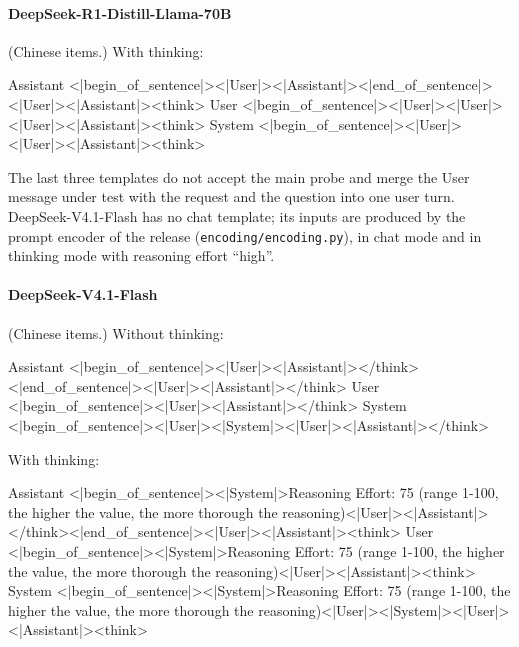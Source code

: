 \paragraph{DeepSeek-R1-Distill-Llama-70B} (Chinese items.)
\noindent With thinking:
\begin{Rendering}
Assistant  <|begin_of_sentence|><|User|><|Assistant|><|end_of_sentence|><|User|><|Assistant|><think>\NL{}
User       <|begin_of_sentence|><|User|><|User|><|User|><|Assistant|><think>\NL{}
System      <|begin_of_sentence|><|User|><|User|><|Assistant|><think>\NL{}
\end{Rendering}

The last three templates do not accept the main probe and merge the User message under test with the request and the question into one user turn. DeepSeek-V4.1-Flash has no chat template; its inputs are produced by the prompt encoder of the release (\texttt{encoding/encoding.py}), in chat mode and in thinking mode with reasoning effort ``high''.

\paragraph{DeepSeek-V4.1-Flash} (Chinese items.)
\noindent Without thinking:
\begin{Rendering}
Assistant  <|begin_of_sentence|><|User|><|Assistant|></think><|end_of_sentence|><|User|><|Assistant|></think>
User       <|begin_of_sentence|><|User|>\NL{}\NL{}\NL{}\NL{}<|Assistant|></think>
System     <|begin_of_sentence|><|User|><|System|><|User|><|Assistant|></think>
\end{Rendering}
\noindent With thinking:
\begin{Rendering}
Assistant  <|begin_of_sentence|><|System|>Reasoning Effort: 75 (range 1-100, the higher the value, the more thorough the reasoning)\NL{}\NL{}<|User|><|Assistant|></think><|end_of_sentence|><|User|><|Assistant|><think>
User       <|begin_of_sentence|><|System|>Reasoning Effort: 75 (range 1-100, the higher the value, the more thorough the reasoning)\NL{}\NL{}<|User|>\NL{}\NL{}\NL{}\NL{}<|Assistant|><think>
System     <|begin_of_sentence|><|System|>Reasoning Effort: 75 (range 1-100, the higher the value, the more thorough the reasoning)\NL{}\NL{}<|User|><|System|><|User|><|Assistant|><think>
\end{Rendering}
